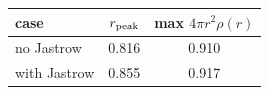 \begin{center}
\label{tab:1h-density}
\setlength{\tabcolsep}{4pt}
\begin{tabular}{@{}lcc@{}}
\toprule
case & $r_{\rm peak}$ & max $4\pi r^2\rho(r)$ \\
\midrule
no Jastrow & 0.816 & 0.910 \\
with Jastrow & 0.855 & 0.917 \\
\bottomrule
\end{tabular}
\end{center}
